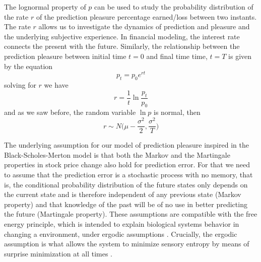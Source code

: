 \documentclass[11pt, onecolumn]{article}
\begin{document}
The lognormal property of $p$ can be used to study the
probability distribution of the rate $r$ of the prediction pleasure percentage earned/loss between two instants. The rate $r$ allows us to investigate the dynamics of prediction and pleasure and the underlying subjective experience. 
In financial modeling, the interest rate connects the present with the future. Similarly, the relationship between the prediction pleasure between initial time $t = 0$ and final time time, $t=T$ is given by the equation
\begin{equation*}
   p_t = p_0 e^{r t}
\label{eq:vpbpt}
\end{equation*}
solving for $r$ we have
\begin{equation*}
   r = \frac{1}{t}\ln \frac{p_t}{p_0}
\label{eq:vpbpt2}
\end{equation*}
and as we saw before, the random variable $\ln p$ is normal, then   
\begin{equation}
   r \sim  N \bigg( \mu - \frac{\sigma ^2}{2} , \frac{\sigma^2}{T} \bigg) 
\label{eq:vpbpt3}
\end{equation}



The underlying assumption for our model of prediction pleasure inspired in the Black-Scholes-Merton model is that both the Markov and the Martingale properties in stock price change also hold for prediction error. For that we need to assume that the prediction error is a stochastic process with no memory, that is, the conditional probability distribution of the future states only depends on the current state and is therefore independent of any previous state (Markov property) and that knowledge of the past will be of no use in better predicting the future (Martingale property). These assumptions are compatible with the free energy principle, which is intended to explain biological systems behavior in changing a environment, under ergodic assumptions \citep{birkhoff_proof_1931}. Crucially, the ergodic assumption is what allows the system to minimize sensory entropy by means of surprise minimization at all times \citep{friston_action_2010}. 
\end{document}
